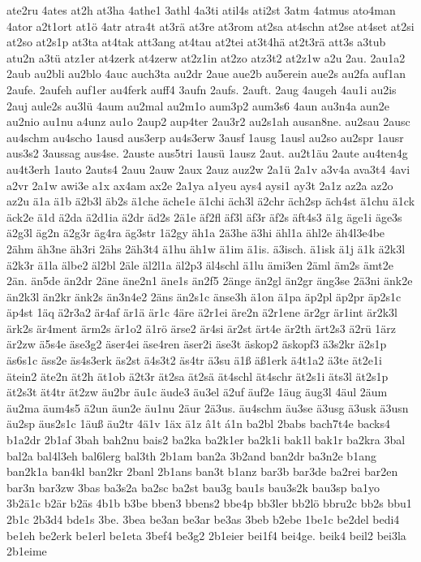 {ate2ru
4ates
at2h
at3ha
4athe1
3athl
4a3ti
atil4s
ati2st
3atm
4atmus
ato4man
4ator
a2t1ort
at1ö
4atr
atra4t
at3rä
at3re
at3rom
at2sa
at4schn
at2se
at4set
at2si
at2so
at2s1p
at3ta
at4tak
att3ang
at4tau
at2tei
at3t4hä
at2t3rä
att3s
a3tub
atu2n
a3tü
atz1er
at4zerk
at4zerw
at2z1in
at2zo
atz3t2
at2z1w
a2u
2au.
2au1a2
2aub
au2bli
au2blo
4auc
auch3ta
au2dr
2aue
aue2b
au5erein
aue2s
au2fa
auf1an
2aufe.
2aufeh
auf1er
au4ferk
auff4
3aufn
2aufs.
2auft.
2aug
4augeh
4au1i
au2is
2auj
aule2s
au3lü
4aum
au2mal
au2m1o
aum3p2
aum3s6
4aun
au3n4a
aun2e
au2nio
au1nu
a4unz
au1o
2aup2
aup4ter
2au3r2
au2s1ah
ausan8ne.
au2sau
2ausc
au4schm
au4scho
1ausd
aus3erp
au4s3erw
3ausf
1ausg
1ausl
au2so
au2spr
1ausr
aus3s2
3aussag
aus4se.
2auste
aus5tri
1ausü
1ausz
2aut.
au2t1äu
2aute
au4ten4g
au4t3erh
1auto
2auts4
2auu
2auw
2aux
2auz
auz2w
2a1ü
2a1v
a3v4a
ava3t4
4avi
a2vr
2a1w
awi3e
a1x
ax4am
ax2e
2a1ya
a1yeu
ays4
aysi1
ay3t
2a1z
az2a
az2o
az2u
ä1a
ä1b
ä2b3l
äb2s
ä1che
äche1e
ä1chi
äch3l
ä2chr
äch2sp
äch4st
ä1chu
ä1ck
äck2e
ä1d
ä2da
ä2d1ia
ä2dr
äd2s
2ä1e
äf2fl
äf3l
äf3r
äf2s
äft4s3
ä1g
äge1i
äge3s
ä2g3l
äg2n
ä2g3r
äg4ra
äg3str
1ä2gy
äh1a
2ä3he
ä3hi
ähl1a
ähl2e
äh4l3e4be
2ähm
äh3ne
äh3ri
2ähs
2äh3t4
ä1hu
äh1w
ä1im
ä1is.
ä3isch.
ä1isk
ä1j
ä1k
ä2k3l
ä2k3r
ä1la
älbe2
äl2bl
2äle
äl2l1a
äl2p3
äl4schl
ä1lu
ämi3en
2äml
äm2s
ämt2e
2än.
än5de
än2dr
2äne
äne2n1
äne1s
än2f5
2änge
än2gl
än2gr
äng3se
2ä3ni
änk2e
än2k3l
än2kr
änk2s
än3n4e2
2äns
än2s1c
änse3h
ä1on
ä1pa
äp2pl
äp2pr
äp2s1c
äp4st
1äq
ä2r3a2
är4af
är1ä
är1c
4äre
ä2r1ei
äre2n
ä2r1ene
är2gr
är1int
är2k3l
ärk2s
är4ment
ärm2s
är1o2
ä1rö
ärse2
är4si
är2st
ärt4e
är2th
ärt2s3
ä2rü
1ärz
är2zw
ä5s4e
äse3g2
äser4ei
äse4ren
äser2i
äse3t
äskop2
äskopf3
ä3s2kr
ä2s1p
äs6s1c
äss2e
äs4s3erk
äs2st
ä4s3t2
äs4tr
ä3su
ä1ß
äß1erk
ä4t1a2
ä3te
ät2e1i
ätein2
äte2n
ät2h
ät1ob
ä2t3r
ät2sa
ät2sä
ät4schl
ät4schr
ät2s1i
äts3l
ät2s1p
ät2s3t
ät4tr
ät2zw
äu2br
äu1c
äude3
äu3el
ä2uf
äuf2e
1äug
äug3l
4äul
2äum
äu2ma
äum4s5
ä2un
äun2e
äu1nu
2äur
2ä3us.
äu4schm
äu3se
ä3usg
ä3usk
ä3usn
äu2sp
äus2s1c
1äuß
äu2tr
4ä1v
1äx
ä1z
â1t
á1n
ba2bl
2babs
bach7t4e
backs4
b1a2dr
2b1af
3bah
bah2nu
bais2
ba2ka
ba2k1er
ba2k1i
bak1l
bak1r
ba2kra
3bal
bal2a
bal4l3eh
bal6lerg
bal3th
2b1am
ban2a
3b2and
ban2dr
ba3n2e
b1ang
ban2k1a
ban4kl
ban2kr
2banl
2b1ans
ban3t
b1anz
bar3b
bar3de
ba2rei
bar2en
bar3n
bar3zw
3bas
ba3s2a
ba2sc
ba2st
bau3g
bau1s
bau3s2k
bau3sp
ba1yo
3b2ä1c
b2är
b2äs
4b1b
b3be
bben3
bbens2
bbe4p
bb3ler
bb2lö
bbru2c
bb2s
bbu1
2b1c
2b3d4
bde1s
3be.
3bea
be3an
be3ar
be3as
3beb
b2ebe
1be1c
be2del
bedi4
be1eh
be2erk
be1erl
be1eta
3bef4
be3g2
2b1eier
bei1f4
bei4ge.
beik4
beil2
bei3la
2b1eime
}
